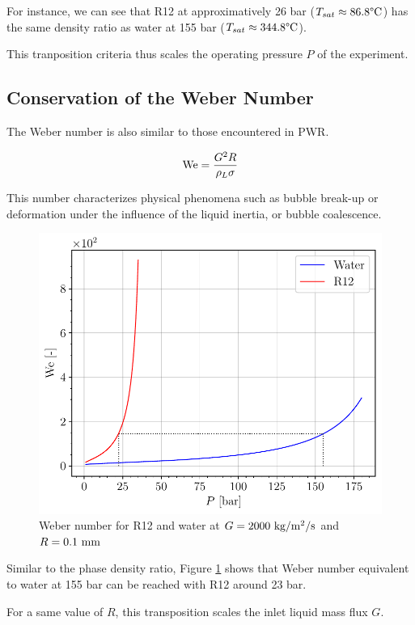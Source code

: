 For instance, we can see that R12 at approximatively 26 bar ($T_{sat} \approx 86.8 \degree\mathrm{C}$) has the same density ratio as water at 155 bar ($T_{sat} \approx 344.8 \degree\mathrm{C}$).

\npar

\begin{note*}{}
This tranposition criteria thus scales the operating pressure $P$ of the experiment.
\end{note*}

\subsection{Conservation of the Weber Number}

The Weber number is also similar to those encountered in PWR.

\begin{equation}
\mathrm{We} = \dfrac{G^{2}R}{\rho_{L} \sigma}
\end{equation}

This number characterizes physical phenomena such as bubble break-up or deformation under the influence of the liquid inertia, or bubble coalescence.

\begin{figure}[!h]
\centering
\includegraphics[width=0.6\linewidth]{img/DEBORA/We_R12_PWR.pdf}
\caption{Weber number for R12 and water at $G=2000~\text{kg/m$^{2}$/s}$ and $R=0.1~\mathrm{mm}$}
\label{fig:We_R12_PWR}
\end{figure}

Similar to the phase density ratio, Figure \ref{fig:We_R12_PWR} shows that Weber number equivalent to water at 155 bar can be reached with  R12 around 23 bar.

\npar

\begin{note*}{}
For a same value of $R$, this transposition scales the inlet liquid mass flux $G$.
\end{note*}


